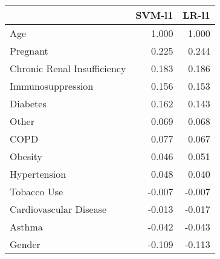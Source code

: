 \begin{tabular}{lrr}
\toprule
{} &  SVM-l1 &  LR-l1 \\
\midrule
Age                         &   1.000 &  1.000 \\
Pregnant                    &   0.225 &  0.244 \\
Chronic Renal Insufficiency &   0.183 &  0.186 \\
Immunosuppression           &   0.156 &  0.153 \\
Diabetes                    &   0.162 &  0.143 \\
Other                       &   0.069 &  0.068 \\
COPD                        &   0.077 &  0.067 \\
Obesity                     &   0.046 &  0.051 \\
Hypertension                &   0.048 &  0.040 \\
Tobacco Use                 &  -0.007 & -0.007 \\
Cardiovascular Disease      &  -0.013 & -0.017 \\
Asthma                      &  -0.042 & -0.043 \\
Gender                      &  -0.109 & -0.113 \\
\bottomrule
\end{tabular}
